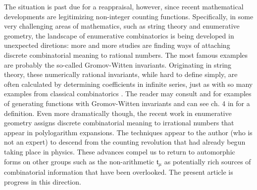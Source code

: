 \documentclass[11pt]{article}
\begin{document}
The situation is past due for a reappraisal, however, since recent mathematical developments are legitimizing non-integer counting functions. Specifically, in some very challenging areas of mathematics, such as string theory and enumerative geometry, the landscape of enumerative combinatorics is being developed in unexpected diretions: more and more studies are finding ways of attaching discrete combinatorial meaning to rational numbers. The most famous examples are probably the so-called Gromov-Witten invariants. Originating in string theory, these numerically rational invariants, while hard to define simply, are often calculated by determining coefficients in infinite series, just as with so many examples from classical combinatorics \cite{wilf1994}. The reader may consult \cite{rose2014} and \cite{yui2011} for examples of generating functions with Gromov-Witten invariants and can see ch. 4 in \cite{KockVainsencher2007} for a definition. Even more dramatically though, the recent work \cite{walcher2012} in enumerative geometry assigns discrete combinatorial meaning to irrational numbers that appear in polylogarithm expansions. The techniques appear to the author (who is not an expert) to descend from the counting revolution that had already begun taking place in physics. These advances compel us to return to automorphic forms on other groups such as the non-arithmetic $ \mathfrak{t}_\mu $ as potentially rich sources of combinatorial information that have been overlooked. The present article is progress in this direction.
\end{document}
